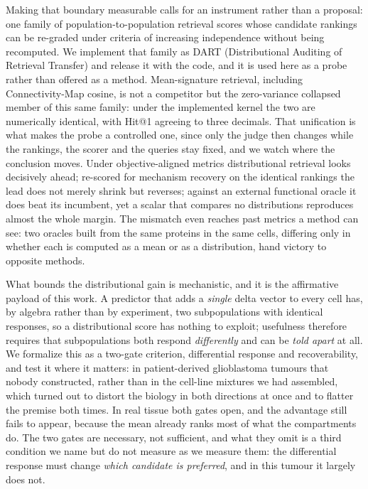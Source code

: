 \documentclass[11pt,letterpaper]{article}
\begin{document}
Making that boundary measurable calls for an instrument rather than a proposal: one family of population-to-population retrieval scores whose candidate rankings can be re-graded under criteria of increasing independence without being recomputed. We implement that family as DART (Distributional Auditing of Retrieval Transfer) and release it with the code, and it is used here as a probe rather than offered as a method. Mean-signature retrieval, including Connectivity-Map cosine, is not a competitor but the zero-variance collapsed member of this same family: under the implemented kernel the two are numerically identical, with Hit@1 agreeing to three decimals. That unification is what makes the probe a controlled one, since only the judge then changes while the rankings, the scorer and the queries stay fixed, and we watch where the conclusion moves. Under objective-aligned metrics distributional retrieval looks decisively ahead; re-scored for mechanism recovery on the identical rankings the lead does not merely shrink but reverses; against an external functional oracle it does beat its incumbent, yet a scalar that compares no distributions reproduces almost the whole margin. The mismatch even reaches past metrics a method can see: two oracles built from the same proteins in the same cells, differing only in whether each is computed as a mean or as a distribution, hand victory to opposite methods.

What bounds the distributional gain is mechanistic, and it is the affirmative payload of this work. A predictor that adds a \emph{single} delta vector to every cell has, by algebra rather than by experiment, two subpopulations with identical responses, so a distributional score has nothing to exploit; usefulness therefore requires that subpopulations both respond \emph{differently} and can be \emph{told apart} at all. We formalize this as a two-gate criterion, differential response and recoverability, and test it where it matters: in patient-derived glioblastoma tumours that nobody constructed, rather than in the cell-line mixtures we had assembled, which turned out to distort the biology in both directions at once and to flatter the premise both times. In real tissue both gates open, and the advantage still fails to appear, because the mean already ranks most of what the compartments do. The two gates are necessary, not sufficient, and what they omit is a third condition we name but do not measure as we measure them: the differential response must change \emph{which candidate is preferred}, and in this tumour it largely does not.
\end{document}
